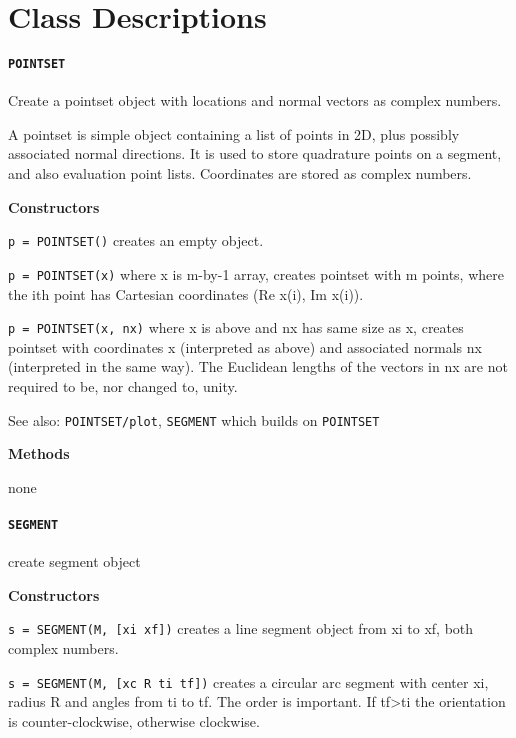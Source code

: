 \appendix

\setlength{\parskip}{\baselineskip}
\setlength{\parindent}{0pt}

\section{Class Descriptions}


\paragraph{\tt POINTSET}

Create a pointset object with locations and normal vectors as
complex numbers.

A pointset is simple object containing a list of points in 2D, plus possibly
associated normal directions.  It is used to store quadrature points on a
segment, and also evaluation point lists. Coordinates are stored as 
complex numbers.

\textbf{Constructors}

{\tt p = POINTSET()}
creates an empty object.
 
{\tt p = POINTSET(x)} where x is m-by-1 array, creates pointset with m points, where
the ith point has Cartesian coordinates (Re x(i), Im x(i)).
  
{\tt p = POINTSET(x, nx)} where x is above and nx has same size as x, creates
pointset with coordinates x (interpreted as above) and associated normals
nx (interpreted in the same way). The Euclidean lengths of the vectors in
nx are not required to be, nor changed to, unity.

See also: {\tt POINTSET/plot}, {\tt SEGMENT} which builds on {\tt POINTSET}

\textbf{Methods}

none


\newpage

\paragraph{\tt SEGMENT} create segment object

\textbf{Constructors}

{\tt s = SEGMENT(M, [xi xf])}  creates a line segment object from xi to xf, both
complex numbers.

{\tt s = SEGMENT(M, [xc R ti tf])} creates a circular arc segment with center
xi, radius R and angles from ti to tf. The order is important. If tf>ti
the orientation is counter-clockwise, otherwise clockwise.
  
